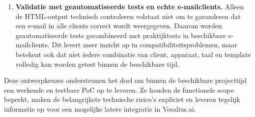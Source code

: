 \begin{enumerate}
    \item \textbf{Validatie met geautomatiseerde tests en echte
    e-mailclients.}
    Alleen de HTML-output technisch controleren volstaat niet om te
    garanderen dat een e-mail in alle clients correct wordt weergegeven.
    Daarom worden geautomatiseerde tests gecombineerd met praktijktests
    in beschikbare e-mailclients. Dit levert meer inzicht op in
    compatibiliteitsproblemen, maar betekent ook dat niet iedere combinatie
    van client, apparaat, taal en template volledig kan worden getest
    binnen de beschikbare tijd.
\end{enumerate}

Deze ontwerpkeuzes ondersteunen het doel om binnen de beschikbare
projecttijd een werkende en testbare PoC op te leveren. Ze houden de
functionele scope beperkt, maken de belangrijkste technische risico's
expliciet en leveren tegelijk informatie op voor een mogelijke latere
integratie in Vesalius.ai.

